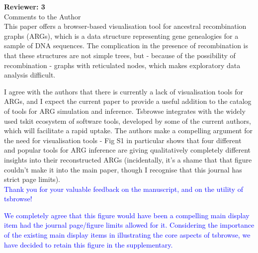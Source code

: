 \documentclass{article}
\begin{document}
\textbf{Reviewer: 3}\\

Comments to the Author\\
This paper offers a browser-based visualisation tool for ancestral recombination graphs (ARGs), which is 
a data structure representing gene genealogies for a sample of DNA sequences. The complication in the 
presence of recombination is that these structures are not simple trees, but - because of the possibility 
of recombination - graphs with reticulated nodes, which makes exploratory data analysis difficult.

I agree with the authors that there is currently a lack of visualisation tools for ARGs, and I expect the 
current paper to provide a useful addition to the catalog of tools for ARG simulation and inference. Tsbrowse 
integrates with the widely used tskit ecosystem of software tools, developed by some of the current authors, 
which will facilitate a rapid uptake. The authors make a compelling argument for the need for visualisation 
tools - Fig S1 in particular shows that four different and popular tools for ARG inference are giving 
qualitatively completely different insights into their reconstructed ARGs (incidentally, it's a shame that 
that figure couldn't make it into the main paper, though I recognise that this journal has strict page limits).\\
\textcolor{blue}{Thank you for your valuable feedback on the manuscript, and on the utility of tsbrowse!}

\textcolor{blue}{We completely agree that this figure would have been a compelling main display item had the journal 
page/figure limits allowed for it. Considering the importance of the existing main display items in illustrating 
the core aspects of tsbrowse, we have decided to retain this figure in the supplementary.}\\
\end{document}
